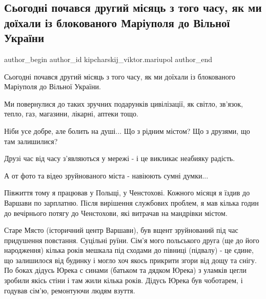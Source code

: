  
 
 
 
 

\subsection{Сьогодні почався другий місяць з того часу, як ми доїхали із блокованого Маріуполя до Вільної України}
\label{sec:16_04_2022.fb.kipcharskij_viktor.mariupol.1.sogodn__pochavsya_dr}

\ifcmt
 author_begin
   author_id kipcharskij_viktor.mariupol
 author_end
\fi

Сьогодні почався другий місяць з того часу, як ми доїхали із блокованого
Маріуполя до Вільної України.

Ми повернулися до таких зручних подарунків цивілізації, як світло, зв'язок,
тепло, газ, магазини, лікарні, аптеки тощо.

Ніби усе добре, але болить на душі... Що з рідним містом? Що з друзями, що там
залишилися?

Друзі час від часу з'являються у мережі - і це викликає неабияку радість.

А от фото та відео зруйнованого міста - навіюють сумні думки...

Півжиття тому я працював у Польщі, у Ченстохові. Кожного місяця я їздив до
Варшави по зарплатню. Після вирішення службових проблем, я мав кілька годин до
вечірнього потягу до Ченстохови, які витрачав на мандрівки містом. 

Старе Място (історичний центр Варшави), був вщент зруйнований під час
придушення повстання. Суцільні руїни. Сім'я мого польського друга (ще до його
народження) кілька років мешкала під сходами до півниці (підвалу) - це єдине,
що залишилося від будинку і могло хоч якось прикрити згори від дощу та снігу.
По боках дідусь Юрека с синами (батьком та дядком Юрека) з уламків цегли
зробили якісь стіни і там жили кілька років. Дідусь Юрека був чоботарем, і
годував сім'ю, ремонтуючи людям взуття.

